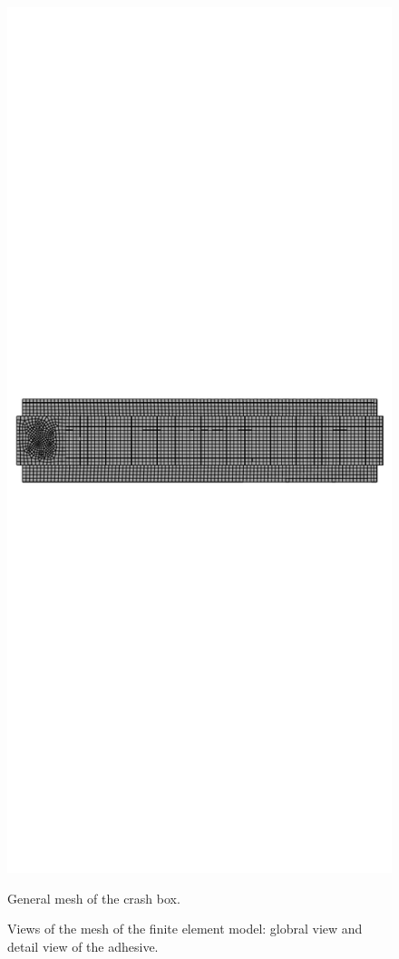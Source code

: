 \documentclass[cmfonts]{witpress}
\begin{document}
\begin{figure}[htpb]
\begin{minipage}[b]{.7\linewidth}
		\includegraphics[width=\linewidth]{figures/IMG_CUTRES/mesh}
		\caption{General mesh of the crash box.}
		\label{fig:mesh}
	\end{minipage}
	\caption{Views of the mesh of the finite element model: globral view and detail view of the adhesive.}
	\label{fig:mallas}
\end{figure}
\end{document}
